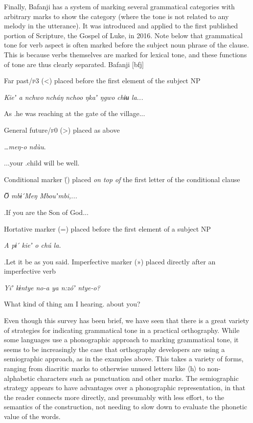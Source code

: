 \documentclass[output=paper]{langscibook}
\begin{document}
Finally, Bafanji has a system of marking several grammatical categories with arbitrary marks to show the category (where the tone is not related to any melody in the utterance). It was introduced and applied to the first published portion of Scripture, the Gospel of Luke, in 2016. Note below that grammatical tone for verb aspect is often marked before the subject noun phrase of the clause. This is because verbs themselves are marked for lexical tone, and these functions of tone are thus clearly separated.
\ea 
Bafanji [bfj] \citep{Hamm2016}
\label{ex:cahill:XlistExample}
\begin{xlist}
\ex \hspace{1ex}Far past/\textsc{p3} (<) placed  before the first element of the subject NP

\textit{Kieʼ \highlight{<}a nchwo ncháŋ nchoo ŋkaʼ ŋgwo chɨʉ la...}

As .he was reaching at the gate of the village... 

\ex \hspace{1ex} General future/\textsc{f0} (>) placed as above

\textit{…\highlight{>}meŋ-o ndùu}.

...your .child will be well.

\ex  \hspace{1ex} Conditional marker  (\hspace{1ex}̄) placed \textit{on top of} the first letter of the  conditional clause

\textit{ O̅ mbɨ ́Meŋ Mbouʼmbi,...}

.If you are the Son of God...

\ex \hspace{1ex} Hortative  marker (=) placed  before the first element of a subject NP

\textit{\highlight{=}A pɨ ́ kieʼ o chú la.}

.Let it be as you said. 
\ex \hspace{1ex} Imperfective  marker (») placed directly after an imperfective verb

\textit{Yiʼ kɨntye no-a ya n:zóʼ ntye-o? }

What kind of thing am I hearing. about you? 

\end{xlist}
\z

Even though this survey has been brief, we have seen that there is a great variety of strategies for indicating grammatical tone in a practical orthography. While some languages use a phonographic approach to marking grammatical tone, it seems to be increasingly the case that orthography developers are using a semiographic approach, as in the examples above. This takes a variety of forms, ranging from diacritic marks to otherwise unused letters like 〈h〉 to non-alphabetic characters such as punctuation and other marks. The semiographic strategy appears to have advantages over a phonographic representation, in that the reader connects more directly, and presumably with less effort, to the semantics of the construction, not needing to slow down to evaluate the phonetic value of the words.  
\end{document}
